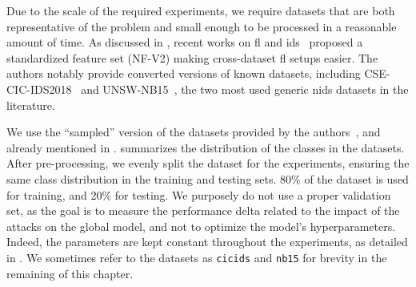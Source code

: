 Due to the scale of the required experiments, we require datasets that are both representative of the problem and small enough to be processed in a reasonable amount of time.
As discussed in , recent works on \gls{fl} and \gls{ids}~\cite{sarhan_StandardFeatureSet_2021} proposed a standardized feature set (NF-V2) making cross-dataset \gls{fl} setups easier.
The authors notably provide converted versions of known datasets, including CSE-CIC-IDS2018~\cite{sharafaldin_GeneratingNewIntrusion_2018} and UNSW-NB15~\cite{moustafa_UNSWNB15comprehensivedata_2015}, the two most used generic \gls{nids} datasets in the literature.

We use the ``sampled'' version of the datasets provided by the authors~\cite{layeghy_GeneralisabilityMachineLearningbased_2022}, and already mentioned in .
 summarizes the distribution of the classes in the datasets.
After pre-processing, we evenly split the dataset for the experiments, ensuring the same class distribution in the training and testing sets.
80\% of the dataset is used for training, and 20\% for testing.
We purposely do not use a proper validation set, as the goal is to measure the performance delta related to the impact of the attacks on the global model, and not to optimize the model's hyperparameters.
Indeed, the parameters are kept constant throughout the experiments, as detailed in .
We sometimes refer to the datasets as \texttt{cicids} and \texttt{nb15} for brevity in the remaining of this chapter.

